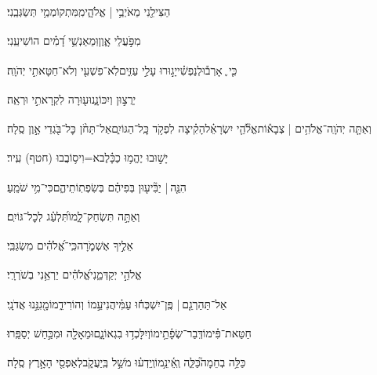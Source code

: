 \documentclass[12pt]{article}
\newcommand{\loc}[1]{\textsuperscript{\locf{#1}}}
\begin{document}
{\loc{ ב}~}‏הַצִּילֵ֖נִי מֵאֹיְבַ֥י | אֱלֹהָ֑י{\hfill}מִֽמִּתְקוֹמְמַ֥י תְּשַׂגְּבֵֽנִי׃\par

{\loc{ ג}~}‏ מִפֹּ֣עֲלֵי אָ֑וֶן{\hfill}וּֽמֵאַנְשֵׁ֥י דָ֝מִ֗ים הוֹשִׁיעֵֽנִי׃\par

{\loc{ ד}~}‏כִּ֤י ֪ אָרְב֡וּ{\hfill}לְנַפְשִׁ֗י\newline\hspace*{.5em}יָג֣וּרוּ עָלַ֣י עַזִּ֑ים{\hfill}לֹֽא־פִשְׁעִ֖י וְלֹא־חַטָּאתִ֣י יְהֹוָֽה׃\par

{\loc{ ה}~}‏ יְרֻצ֣וּן וְיִכּוֹנָ֑נוּ{\hfill}ע֖וּרָה לִקְרָאתִ֣י וּרְאֵֽה׃\par

{\loc{ ו}~}‏וְאַתָּ֤ה יְהֹוָֽה־אֱלֹהִ֥ים | צְבָא֡וֹת{\hfill}אֱלֹ֘הֵ֤י יִשְׂרָאֵ֗ל\newline\hspace*{.5em}הָקִ֗יצָה לִפְקֹ֥ד כׇּֽל־הַגּוֹיִ֑ם{\hfill}אַל־תָּחֹ֨ן כׇּל־בֹּ֖גְדֵי אָ֣וֶן סֶֽלָה׃\par

{\loc{ ז}~}‏יָשׁ֣וּבוּ  יֶהֱמ֥וּ כַכָּ֗לֶב{\hfill}א=וִיס֥וֹבֲבוּ (חטף) עִֽיר׃\par

{\loc{ ח}~}‏הִנֵּ֤ה |  יַבִּ֘יע֤וּן בְּפִיהֶ֗ם{\hfill} בְּשִׂפְתֽוֹתֵיהֶ֑ם{\hfill}כִּי־מִ֥י שֹׁמֵֽעַ׃\par

{\loc{ ט}~}‏וְאַתָּ֣ה  תִּשְׂחַק־לָ֑מוֹ{\hfill}תִּ֝לְעַ֗ג לְכׇל־גּוֹיִֽם׃\par

{\loc{ י}~}‏ אֵלֶ֣יךָ אֶשְׁמֹ֑רָה{\hfill}כִּֽי־אֱ֝לֹהִ֗ים מִשְׂגַּבִּֽי׃\par

{\loc{ יא}~}‏אֱלֹהֵ֣י  יְקַדְּמֵ֑נִי{\hfill}אֱ֝לֹהִ֗ים יַרְאֵ֥נִי בְשֹׁרְרָֽי׃\par

{\loc{ יב}~}‏אַל־תַּהַרְגֵ֤ם |  פֶּֽן־יִשְׁכְּח֬וּ עַמִּ֗י{\hfill}הֲנִיעֵ֣מוֹ  וְהוֹרִידֵ֑מוֹ{\hfill}מָ֖גִנֵּ֣נוּ אֲדֹנָֽי׃\par

{\loc{ יג}~}‏חַטַּאת־פִּ֗ימוֹ{\hfill}דְּֽבַר־שְׂפָ֫תֵ֥ימוֹ\newline\hspace*{.5em}וְיִלָּכְד֥וּ בִגְאוֹנָ֑ם{\hfill}וּמֵאָלָ֖ה וּמִכַּ֣חַשׁ יְסַפֵּֽרוּ׃\par

{\loc{ יד}~}‏כַּלֵּ֥ה בְחֵמָה֮{\hfill}כַּלֵּ֢ה וְֽאֵ֫ינֵ֥מוֹ\newline\hspace*{.5em}וְֽיֵדְע֗וּ  מֹשֵׁ֣ל בְּֽיַעֲקֹ֑ב{\hfill}לְאַפְסֵ֖י הָאָ֣רֶץ סֶֽלָה׃\par
\end{document}
